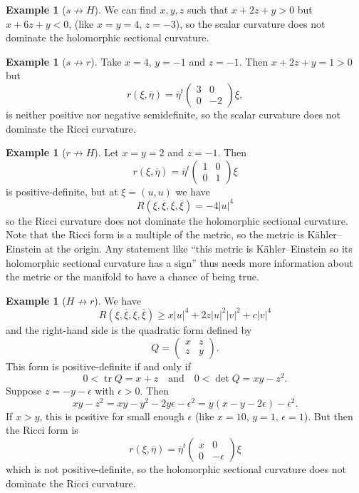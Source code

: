 \documentclass[10pt,a4paper]{amsart}
\theoremstyle{definition}
\newtheorem{exam}[theo]{Example}
\def\ov#1{\overline{#1}}
\def\qandq{\quad\text{and}\quad}
\DeclareMathOperator{\tr}{tr}
\begin{document}
\begin{exam}[$s \not\to H$]
We can find $x, y, z$ such that $x + 2z + y > 0$ but $x + 6z + y < 0$,
(like $x = y = 4$, $z = -3$), so the scalar curvature does not dominate
the holomorphic sectional curvature.
\end{exam}

\begin{exam}[$s \not\to r$]
Take $x = 4$, $y = -1$ and $z = -1$. Then $x + 2z + y = 1 > 0$ but
$$
r(\xi, \ov \eta) =
\ov\eta^t
\begin{pmatrix}
3 & 0 \\ 0 & -2
\end{pmatrix}
\xi,
$$
is neither positive nor negative semidefinite, so the scalar curvature
does not dominate the Ricci curvature.
\end{exam}

\begin{exam}[$r \not\to H$]
Let $x = y = 2$ and $z = -1$. Then
$$
r(\xi, \ov \eta) =
\ov\eta^t
\begin{pmatrix}
1 & 0 \\ 0 & 1
\end{pmatrix}
\xi
$$
is positive-definite, but at $\xi = (u, u)$ we have
$$
R(\xi, \ov \xi, \xi, \ov \xi) = -4 |u|^4
$$
so the Ricci curvature does not dominate the holomorphic sectional curvature.
Note that the Ricci form is a multiple of the metric, so the metric is
K\"ahler--Einstein at the origin.
Any statement like ``this metric is K\"ahler--Einstein so its holomorphic
sectional curvature has a sign'' thus needs more information about the metric
or the manifold to have a chance of being true.
\end{exam}

\begin{exam}[$H \not\to r$]
We have
$$
R(\xi, \ov \xi, \xi, \ov \xi)
\geq
x |u|^4 + 2z |u|^2 |v|^2 + c |v|^4
$$
and the right-hand side is the quadratic form defined by
$$
Q = \begin{pmatrix}
x & z \\ z & y
\end{pmatrix}.
$$
This form is positive-definite if and only if
$$
0 < \tr Q = x + z
\qandq
0 < \det Q = xy - z^2.
$$
Suppose $z = -y - \epsilon$ with $\epsilon > 0$.
Then
$$
xy - z^2
= xy - y^2 - 2y \epsilon - \epsilon^2
= y(x - y - 2\epsilon) - \epsilon^2.
$$
If $x > y$, this is positive for small enough $\epsilon$ (like $x = 10$, $y =
1$, $\epsilon = 1$).
But then the Ricci form is
$$
r(\xi, \ov \eta) =
\ov\eta^t
\begin{pmatrix}
x & 0 \\ 0 & -\epsilon
\end{pmatrix}
\xi
$$
which is not positive-definite,
so the holomorphic sectional curvature does not dominate the Ricci
curvature.
\end{exam}
\end{document}
